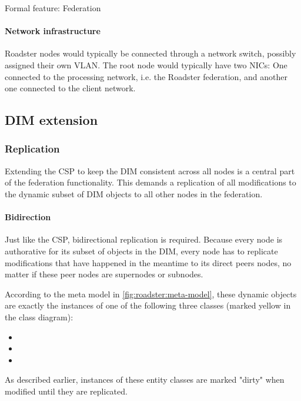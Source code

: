 \begin{listing}
	\inputminted{Gherkin}{listings/features/federation/federation.feature}
	\caption{Formal feature: Federation}
	\label{lst:feature:federation}
\end{listing}

\paragraph{Network infrastructure} Roadster nodes would typically be connected
through a network switch, possibly assigned their own \gls{VLAN}. The root node
would typically have two \glspl{NIC}: One connected to the processing network,
i.e. the Roadster federation, and another one connected to the client network.

\subsection{DIM extension}

\subsubsection{Replication}
Extending the \gls{CSP} to keep the \gls{DIM} consistent across all nodes is a central
part of the federation functionality. This demands a replication of all modifications to
the dynamic subset of DIM objects to all other nodes in the federation.

\paragraph{Bidirection} Just like the CSP, bidirectional replication is required.
Because every node is authorative for its subset of objects in the
DIM, every node has to replicate modifications that have happened in the
meantime to its direct peers nodes, no matter if these peer nodes are
supernodes or subnodes.

According to the meta model in \autoref{fig:roadster:meta-model}, these dynamic
objects are exactly the instances of one of the following three
classes (marked yellow in the class diagram):
\begin{itemize}
	\item {}
	\item {}
	\item {}
\end{itemize}

As described earlier, instances of these entity classes are marked "dirty" when
modified until they are replicated.

